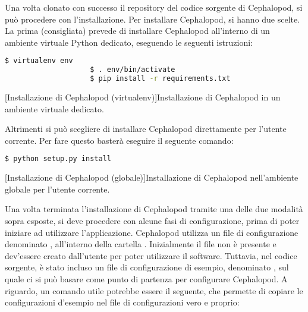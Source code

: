             Una volta clonato con successo il repository del codice sorgente di Cephalopod, si può procedere con l'installazione. Per installare Cephalopod, si hanno due scelte. La prima (consigliata) prevede di installare Cephalopod all'interno di un ambiente virtuale Python dedicato, eseguendo le seguenti istruzioni:
            
            \begin{center}
                \begin{lstlisting}[language=bash, gobble=18]
                    $ virtualenv env
                    $ . env/bin/activate
                    $ pip install -r requirements.txt
                \end{lstlisting}
                \captionsetup{textformat=empty,labelformat=empty} \vspace{-2em}
                [Installazione di Cephalopod (virtualenv)]{Installazione di Cephalopod in un ambiente virtuale dedicato.}
            \end{center}
            
            Altrimenti si può scegliere di installare Cephalopod direttamente per l'utente corrente. Per fare questo basterà eseguire il seguente comando:
            
            \begin{center}
                \begin{lstlisting}[language=bash, gobble=18]
                    $ python setup.py install
                \end{lstlisting}
                \captionsetup{textformat=empty,labelformat=empty} \vspace{-2em}
                [Installazione di Cephalopod (globale)]{Installazione di Cephalopod nell'ambiente globale per l'utente corrente.}
            \end{center}
            
            Una volta terminata l'installazione di Cephalopod tramite una delle due modalità sopra esposte, si deve procedere con alcune fasi di configurazione, prima di poter iniziare ad utilizzare l'applicazione.
            Cephalopod utilizza un file di configurazione denominato , all'interno della cartella . Inizialmente il file non è presente e dev'essere creato dall'utente per poter utilizzare il software. Tuttavia, nel codice sorgente, è stato incluso un file di configurazione di esempio, denominato , sul quale ci si può basare come punto di partenza per configurare Cephalopod. A riguardo, un comando utile potrebbe essere il seguente, che permette di copiare le configurazioni d'esempio nel file di configurazioni vero e proprio:
            
